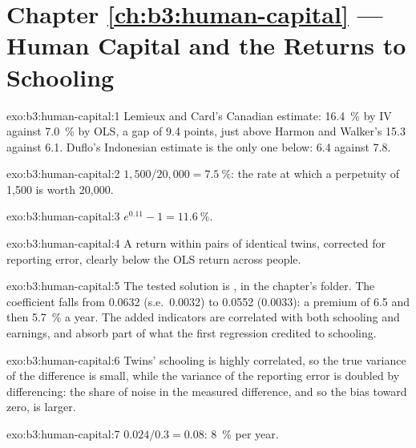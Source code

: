\section*{Chapter \ref{ch:b3:human-capital} --- Human Capital and the Returns to Schooling}

\begin{solution}{exo:b3:human-capital:1}
Lemieux and Card's Canadian estimate: 16.4~\% by IV against 7.0~\% by OLS, a gap of 9.4 points,
just above Harmon and Walker's 15.3 against 6.1. Duflo's Indonesian estimate is the only
one below: 6.4 against 7.8. %
\end{solution}

\begin{solution}{exo:b3:human-capital:2}
$1{,}500/20{,}000 = 7.5~\%$: the rate at which a perpetuity of 1{,}500 is worth 20{,}000.
\end{solution}

\begin{solution}{exo:b3:human-capital:3}
$e^{0.11} - 1 = 11.6~\%$.
\end{solution}

\begin{solution}{exo:b3:human-capital:4}
A return within pairs of identical twins, corrected for reporting error, clearly
below the OLS return across people.
\end{solution}

\begin{solution}{exo:b3:human-capital:5}
The tested solution is , in the chapter's 
folder. The coefficient falls from 0.0632 (s.e.\ 0.0032) to 0.0552 (0.0033): a premium of 6.5 and
then 5.7~\% a year. %
The added indicators are correlated with both schooling and earnings, and absorb part
of what the first regression credited to schooling.
\end{solution}

\begin{solution}{exo:b3:human-capital:6}
Twins' schooling is highly correlated, so the true variance of the difference is small,
while the variance of the reporting error is doubled by differencing: the share of
noise in the measured difference, and so the bias toward zero, is larger.
\end{solution}

\begin{solution}{exo:b3:human-capital:7}
$0.024/0.3 = 0.08$: 8~\% per year.
\end{solution}

